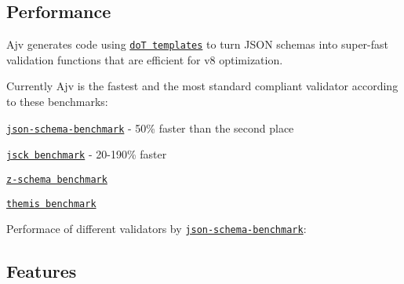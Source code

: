 \subsection*{Performance}

Ajv generates code using \href{https://github.com/olado/doT}{\tt doT templates} to turn J\+S\+ON schemas into super-\/fast validation functions that are efficient for v8 optimization.

Currently Ajv is the fastest and the most standard compliant validator according to these benchmarks\+:


\begin{DoxyItemize}
\item \href{https://github.com/ebdrup/json-schema-benchmark}{\tt json-\/schema-\/benchmark} -\/ 50\% faster than the second place
\item \href{https://github.com/pandastrike/jsck#benchmarks}{\tt jsck benchmark} -\/ 20-\/190\% faster
\item \href{https://rawgit.com/zaggino/z-schema/master/benchmark/results.html}{\tt z-\/schema benchmark}
\item \href{https://cdn.rawgit.com/playlyfe/themis/master/benchmark/results.html}{\tt themis benchmark}
\end{DoxyItemize}

Performace of different validators by \href{https://github.com/ebdrup/json-schema-benchmark}{\tt json-\/schema-\/benchmark}\+:

\href{https://github.com/ebdrup/json-schema-benchmark/blob/master/README.md#performance}{\tt }

\subsection*{Features}


